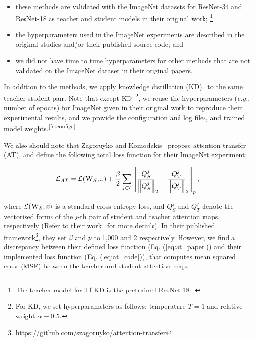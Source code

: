 \documentclass[runningheads]{llncs}
\newcommand\norm[1]{\left\lVert#1\right\rVert}
\begin{document}
\begin{itemize}
    \setlength\itemsep{0em}
    \item these methods are validated with the ImageNet datasets for ResNet-34 and ResNet-18 as teacher and student models in their original work; \footnote{The teacher model for Tf-KD is the pretrained ResNet-18~\cite{yuan2020revisiting}.}
    \item the hyperparameters used in the ImageNet experiments are described in the original studies and/or their published source code; and
    \item we did not have time to tune hyperparameters for other methods that are not validated on the ImageNet dataset in their original papers.
\end{itemize}

In addition to the methods, we apply knowledge distillation (KD)~\cite{hinton14distilling} to the same teacher-student pair.
Note that except KD~\footnote{For KD, we set hyperparameters as follows: temperature $T = 1$ and relative weight $\alpha = 0.5$.}, we reuse the hyperparameters (\emph{e.g.}, number of epochs) for ImageNet given in their original work to reproduce their experimental results, and we provide the configuration and log files, and trained model weights.\textsuperscript{\ref{fn:configs}}


We also should note that Zagoruyko and Komodakis~\cite{zagoruyko2017paying} propose attention transfer (AT), and define the following total loss function for their ImageNet experiment:

\begin{equation}
    \mathcal{L}_{AT} = \mathcal{L}(\textsc{W}_{S}, x) + \frac{\beta}{2}\sum_{j \in \mathcal{I}} \norm{\frac{Q_{S}^{j}}{\norm{Q_{S}^{j}}}_{2} - \frac{Q_{T}^{j}}{\norm{Q_{T}^{j}}}_{2}}_{p},
    \label{eq:at_paper}
\end{equation}

\noindent where $\mathcal{L}(\textsc{W}_{S}, x)$ is a standard cross entropy loss, and $Q_{S}^{j}$ and $Q_{T}^{j}$ denote the vectorized forms of the $j$-th pair of student and teacher attention maps, respectively (Refer to their work~\cite{zagoruyko2017paying} for more details).
In their published framework\footnote{\url{https://github.com/szagoruyko/attention-transfer}}, they set $\beta$ and $p$ to 1,000 and 2 respectively.
However, we find a discrepancy between their defined loss function (Eq. (\ref{eq:at_paper})) and their implemented loss function (Eq. (\ref{eq:at_code})), that computes mean squared error (MSE) between the teacher and student attention maps.
\end{document}
